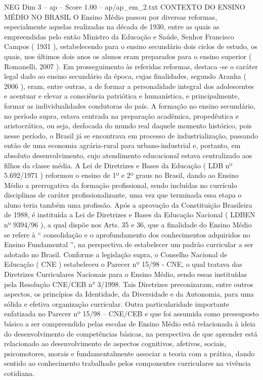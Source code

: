 \begin{textsample}{NEG Dim 3 – ap – Score 1.00 – ap/ap\_em\_2.txt}  \label{ex:f3_neg_110}
CONTEXTO DO ENSINO MÉDIO NO BRASIL O Ensino Médio passou por diversas reformas, especialmente aquelas realizadas na década de 1930, entre as quais as empreendidas pelo então Ministro da Educação e Saúde, Senhor Francisco Campos ( 1931 ), estabelecendo para o ensino secundário dois ciclos de estudo, os quais, nos últimos dois anos os alunos eram preparados para o ensino superior ( Romanelli, 2007 ).
Em prosseguimento às referidas reformas, destaca -se o caráter legal dado ao ensino secundário da época, cujas finalidades, segundo Aranha ( 2006 ), eram, entre outras, a de formar a personalidade integral dos adolescentes e acentuar e elevar a consciência patriótica e humanística, e principalmente, formar as individualidades condutoras do país.
A formação no ensino secundário, no período supra, estava centrada na preparação acadêmica, propedêutica e aristocrática, ou seja, desfocada do mundo real daquele momento histórico, pois nesse período, o Brasil já se encontrava em processo de industrialização, passando então de uma economia agrária-rural para urbano-industrial e, portanto, em absoluto desenvolvimento, cujo atendimento educacional estava centralizado aos filhos da classe média.
A Lei de Diretrizes e Bases da Educação ( LDB nº 5.692/1971 ) reformou o ensino de 1º e 2º graus no Brasil, dando ao Ensino Médio a prerrogativa da formação profissional, sendo incluídas no currículo disciplinas de caráter profissionalizante, uma vez que terminada essa etapa o aluno teria também uma profissão.
Após a aprovação da Constituição Brasileira de 1988, é instituída a Lei de Diretrizes e Bases da Educação Nacional ( LDBEN nº 9394/96 ), a qual dispõe nos Arts. 35 e 36, que a finalidade do Ensino Médio se refere à “ consolidação e o aprofundamento dos conhecimentos adquiridos no Ensino Fundamental ”, na perspectiva de estabelecer um padrão curricular a ser adotado no Brasil.
Conforme a legislação supra, o Conselho Nacional de Educação ( CNE ) estabeleceu o Parecer nº 15/98 - CNE, o qual tratava das Diretrizes Curriculares Nacionais para o Ensino Médio, sendo essas instituídas pela Resolução CNE/CEB n{\EmojiFont °} 3/1998.
Tais Diretrizes preconizaram, entre outros aspectos, os princípios da Identidade, da Diversidade e da Autonomia, para uma sólida e efetiva organização curricular.
Outra particularidade importante enfatizada no Parecer nº 15/98 – CNE/CEB e que foi assumida como pressuposto básico a ser compreendido pelas escolas de Ensino Médio está relacionada à ideia do desenvolvimento de competências básicas, na perspectiva de que aprender está relacionado ao desenvolvimento de aspectos cognitivos, afetivos, sociais, psicomotores, morais e fundamentalmente associar a teoria com a prática, dando sentido ao conhecimento trabalhado pelos componentes curriculares na vivência cotidiana.

\end{textsample}
